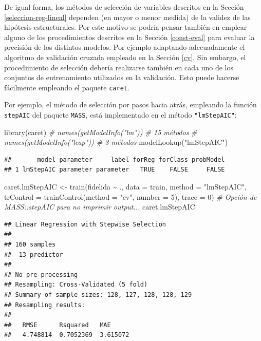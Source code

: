 \documentclass[
  spanish,
]{book}
\newenvironment{Shaded}{\begin{snugshade}}{\end{snugshade}}
\newcommand{\AttributeTok}[1]{\textcolor[rgb]{0.77,0.63,0.00}{#1}}
\newcommand{\CommentTok}[1]{\textcolor[rgb]{0.56,0.35,0.01}{\textit{#1}}}
\newcommand{\DecValTok}[1]{\textcolor[rgb]{0.00,0.00,0.81}{#1}}
\newcommand{\FunctionTok}[1]{\textcolor[rgb]{0.00,0.00,0.00}{#1}}
\newcommand{\NormalTok}[1]{#1}
\newcommand{\OtherTok}[1]{\textcolor[rgb]{0.56,0.35,0.01}{#1}}
\newcommand{\SpecialCharTok}[1]{\textcolor[rgb]{0.00,0.00,0.00}{#1}}
\newcommand{\StringTok}[1]{\textcolor[rgb]{0.31,0.60,0.02}{#1}}
\theoremstyle{break}
\theoremstyle{definition}
\theoremstyle{definition}
\theoremstyle{definition}
\theoremstyle{definition}
\theoremstyle{remark}
\begin{document}
De igual forma, los métodos de selección de variables descritos en la Sección \ref{seleccion-reg-lineal} dependen (en mayor o menor medida) de la validez de las hipótesis estructurales.
Por este motivo se podría pensar también en emplear alguno de los procedimientos descritos en la Sección \ref{const-eval} para evaluar la precisión de los distintos modelos.
Por ejemplo adaptando adecuadamente el algoritmo de validación cruzada empleado en la Sección \ref{cv}.
Sin embargo, el procedimiento de selección debería realizarse también en cada uno de los conjuntos de entrenamiento utilizados en la validación.
Esto puede hacerse fácilmente empleando el paquete \texttt{caret}.

Por ejemplo, el método de selección por pasos hacia atrás, empleando la función \texttt{stepAIC} del paquete \texttt{MASS}, está implementado en el método \texttt{"lmStepAIC"}:

\begin{Shaded}
\begin{Highlighting}[]
\FunctionTok{library}\NormalTok{(caret)}
\CommentTok{\# names(getModelInfo("lm")) \# 15 métodos}
\CommentTok{\# names(getModelInfo("leap")) \# 3 métodos}
\FunctionTok{modelLookup}\NormalTok{(}\StringTok{"lmStepAIC"}\NormalTok{) }
\end{Highlighting}
\end{Shaded}

\begin{verbatim}
##       model parameter     label forReg forClass probModel
## 1 lmStepAIC parameter parameter   TRUE    FALSE     FALSE
\end{verbatim}

\begin{Shaded}
\begin{Highlighting}[]
\NormalTok{caret.lmStepAIC }\OtherTok{\textless{}{-}} \FunctionTok{train}\NormalTok{(fidelida }\SpecialCharTok{\textasciitilde{}}\NormalTok{ ., }\AttributeTok{data =}\NormalTok{ train, }\AttributeTok{method =} \StringTok{"lmStepAIC"}\NormalTok{,}
                   \AttributeTok{trControl =} \FunctionTok{trainControl}\NormalTok{(}\AttributeTok{method =} \StringTok{"cv"}\NormalTok{, }\AttributeTok{number =} \DecValTok{5}\NormalTok{),}
                   \AttributeTok{trace =} \DecValTok{0}\NormalTok{) }\CommentTok{\# Opción de MASS::stepAIC para no imprimir output...}
\NormalTok{caret.lmStepAIC}
\end{Highlighting}
\end{Shaded}

\begin{verbatim}
## Linear Regression with Stepwise Selection 
## 
## 160 samples
##  13 predictor
## 
## No pre-processing
## Resampling: Cross-Validated (5 fold) 
## Summary of sample sizes: 128, 127, 128, 128, 129 
## Resampling results:
## 
##   RMSE      Rsquared   MAE     
##   4.748814  0.7052369  3.615072
\end{verbatim}
\end{document}
